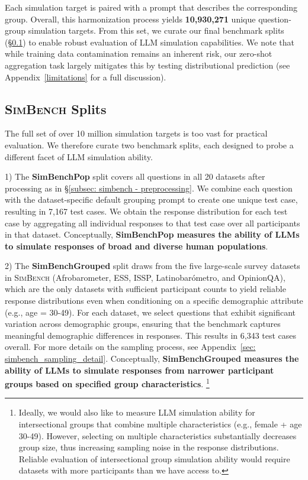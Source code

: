\documentclass{article} %
\begin{document}
Each simulation target is paired with a prompt that describes the corresponding group. Overall, this harmonization process yields \textbf{10,930,271} unique question-group simulation targets. From this set, we curate our final benchmark splits (\S\ref{subsec: simbench - splits}) to enable robust evaluation of LLM simulation capabilities. We note that while training data contamination remains an inherent risk, our zero-shot aggregation task largely mitigates this by testing distributional prediction (see Appendix~\ref{limitations} for a full discussion).

\subsection{\textsc{SimBench} Splits}
\label{subsec: simbench - splits}

The full set of over 10 million simulation targets is too vast for practical evaluation. We therefore curate two benchmark splits, each designed to probe a different facet of LLM simulation ability.

1) The \textbf{SimBenchPop} split covers all questions in all 20 datasets after processing as in \S\ref{subsec: simbench - preprocessing}.
We combine each question with the dataset-specific default grouping prompt to create one unique test case, resulting in 7,167 test cases.
We obtain the response distribution for each test case by aggregating all individual responses to that test case over all participants in that dataset.
Conceptually, \textbf{SimBenchPop measures the ability of LLMs to simulate responses of broad and diverse human populations}.

2) The \textbf{SimBenchGrouped} split draws from the five large-scale survey datasets in \textsc{SimBench} (Afrobarometer, ESS, ISSP, Latinobarómetro, and OpinionQA), which are the only datasets with sufficient participant counts to yield reliable response distributions even when conditioning on a specific demographic attribute (e.g., age = 30-49).
For each dataset, we select questions that exhibit significant variation across demographic groups, ensuring that the benchmark captures meaningful demographic differences in responses.
This results in 6,343 test cases overall.
For more details on the sampling process, see Appendix~\ref{sec: simbench_sampling_detail}.
Conceptually, \textbf{SimBenchGrouped measures the ability of LLMs to simulate responses from narrower participant groups based on specified group characteristics}.%
\footnote{Ideally, we would also like to measure LLM simulation ability for intersectional groups that combine multiple characteristics (e.g., female + age 30-49). However, selecting on multiple characteristics substantially decreases group size, thus increasing sampling noise in the response distributions.
Reliable evaluation of intersectional group simulation ability would require datasets with more participants than we have access to.}
\end{document}
